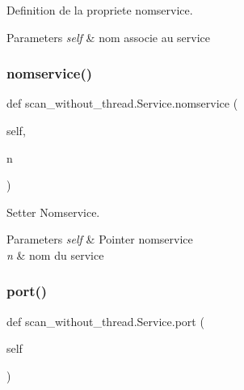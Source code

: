 Definition de la propriete nomservice. 


\begin{DoxyParams}{Parameters}
{\em self} & nom associe au service \\
\hline
\end{DoxyParams}
\hypertarget{classscan__without__thread_1_1Service_a08f7c443e3ca3d4004202eedbb1c6328}{}\label{classscan__without__thread_1_1Service_a08f7c443e3ca3d4004202eedbb1c6328} 
\subsubsection{\texorpdfstring{nomservice()}{nomservice()}\hspace{0.1cm}{\footnotesize\ttfamily [2/2]}}
{\footnotesize\ttfamily def scan\+\_\+without\+\_\+thread.\+Service.\+nomservice (\begin{DoxyParamCaption}\item[{}]{self,  }\item[{}]{n }\end{DoxyParamCaption})}



Setter Nomservice. 


\begin{DoxyParams}{Parameters}
{\em self} & Pointer nomservice \\
\hline
{\em n} & nom du service \\
\hline
\end{DoxyParams}
\hypertarget{classscan__without__thread_1_1Service_a9864cacf5c379a4e4d6d380352091703}{}\label{classscan__without__thread_1_1Service_a9864cacf5c379a4e4d6d380352091703} 
\subsubsection{\texorpdfstring{port()}{port()}\hspace{0.1cm}{\footnotesize\ttfamily [1/2]}}
{\footnotesize\ttfamily def scan\+\_\+without\+\_\+thread.\+Service.\+port (\begin{DoxyParamCaption}\item[{}]{self }\end{DoxyParamCaption})}



